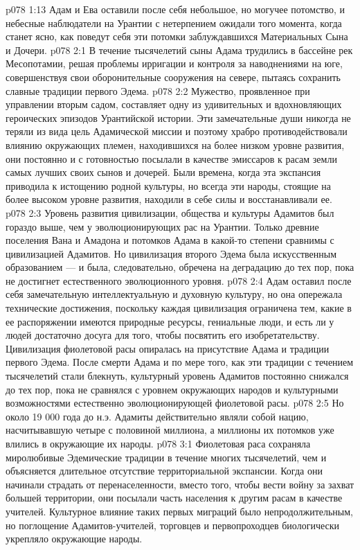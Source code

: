 \vs p078 1:13 Адам и Ева оставили после себя небольшое, но могучее потомство, и небесные наблюдатели на Урантии с нетерпением ожидали того момента, когда станет ясно, как поведут себя эти потомки заблуждавшихся Материальных Сына и Дочери.
\vs p078 2:1 В течение тысячелетий сыны Адама трудились в бассейне рек Месопотамии, решая проблемы ирригации и контроля за наводнениями на юге, совершенствуя свои оборонительные сооружения на севере, пытаясь сохранить славные традиции первого Эдема.
\vs p078 2:2 Мужество, проявленное при управлении вторым садом, составляет одну из удивительных и вдохновляющих героических эпизодов Урантийской истории. Эти замечательные души никогда не теряли из вида цель Адамической миссии и поэтому храбро противодействовали влиянию окружающих племен, находившихся на более низком уровне развития, они постоянно и с готовностью посылали в качестве эмиссаров к расам земли самых лучших своих сынов и дочерей. Были времена, когда эта экспансия приводила к истощению родной культуры, но всегда эти народы, стоящие на более высоком уровне развития, находили в себе силы и восстанавливали ее.
\vs p078 2:3 Уровень развития цивилизации, общества и культуры Адамитов был гораздо выше, чем у эволюционирующих рас на Урантии. Только древние поселения Вана и Амадона и потомков Адама в какой\hyp{}то степени сравнимы с цивилизацией Адамитов. Но цивилизация второго Эдема была искусственным образованием ---  и была, следовательно, обречена на деградацию до тех пор, пока не достигнет естественного эволюционного уровня.
\vs p078 2:4 Адам оставил после себя замечательную интеллектуальную и духовную культуру, но она опережала технические достижения, поскольку каждая цивилизация ограничена тем, какие в ее распоряжении имеются природные ресурсы, гениальные люди, и есть ли у людей достаточно досуга для того, чтобы посвятить его изобретательству. Цивилизация фиолетовой расы опиралась на присутствие Адама и традиции первого Эдема. После смерти Адама и по мере того, как эти традиции с течением тысячелетий стали блекнуть, культурный уровень Адамитов постоянно снижался до тех пор, пока не сравнялся с уровнем окружающих народов и культурными возможностями естественно эволюционирующей фиолетовой расы.
\vs p078 2:5 Но около 19 000 года до н.э. Адамиты действительно являли собой нацию, насчитывавшую четыре с половиной миллиона, а миллионы их потомков уже влились в окружающие их народы.
\vs p078 3:1 Фиолетовая раса сохраняла миролюбивые Эдемические традиции в течение многих тысячелетий, чем и объясняется длительное отсутствие территориальной экспансии. Когда они начинали страдать от перенаселенности, вместо того, чтобы вести войну за захват большей территории, они посылали часть населения к другим расам в качестве учителей. Культурное влияние таких первых миграций было непродолжительным, но поглощение Адамитов\hyp{}учителей, торговцев и первопроходцев биологически укрепляло окружающие народы.
